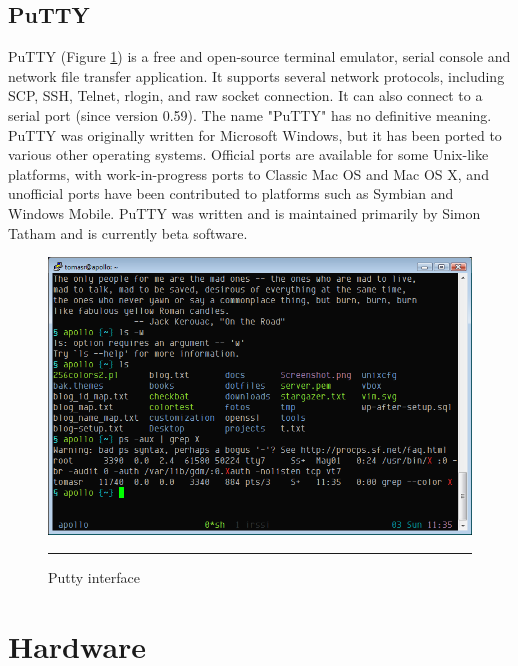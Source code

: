 \subsection{PuTTY}
PuTTY (Figure \ref{fig:putty}) is a free and open-source terminal emulator, serial console and network file transfer application. It supports several network protocols, including SCP, SSH, Telnet, rlogin, and raw socket connection. It can also connect to a serial port (since version 0.59). The name "PuTTY" has no definitive meaning.
PuTTY was originally written for Microsoft Windows, but it has been ported to various other operating systems. Official ports are available for some Unix-like platforms, with work-in-progress ports to Classic Mac OS and Mac OS X, and unofficial ports have been contributed to platforms such as Symbian and Windows Mobile.
PuTTY was written and is maintained primarily by Simon Tatham and is currently beta software.
\begin{figure}[h!]
	\centering
	\vspace{-0.2cm}
	\includegraphics[width=1\textwidth]{./images/putty_tango.png}
	\rule{1\textwidth}{1pt}
	\caption{Putty interface}
	\label{fig:putty}
\end{figure}


\section{Hardware}

